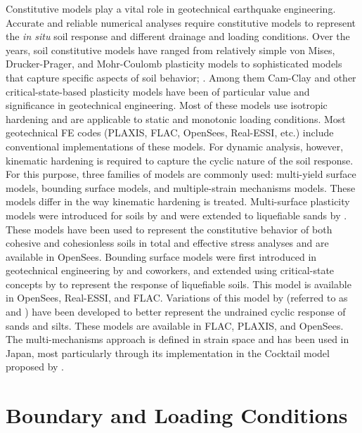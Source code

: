 Constitutive models play a vital role in geotechnical earthquake engineering. Accurate and reliable numerical analyses require constitutive models to represent the \textit{in situ} soil response and different drainage and loading conditions. Over the years, soil constitutive models  have ranged from relatively simple von Mises, Drucker-Prager, and Mohr-Coulomb plasticity models to sophisticated models that capture specific aspects of soil behavior; \cite[see][]{Borja2013}. Among them Cam-Clay and other critical-state-based plasticity models have been of particular value and significance in geotechnical engineering. Most of these models use isotropic hardening and are applicable to static and monotonic loading conditions. Most geotechnical FE codes (PLAXIS, FLAC, OpenSees, Real-ESSI, etc.) include conventional implementations of these models. For dynamic analysis, however, kinematic hardening is required to capture the cyclic nature of the soil response. For this purpose, three families of models are commonly used: multi-yield surface models, bounding surface models, and multiple-strain mechanisms models. These models differ in the way kinematic hardening is treated. Multi-surface plasticity models were introduced for soils by \citet{Prevost77, Prevost85a} and were extended to liquefiable sands by \citet{Elgamal03}. These models have been used to represent the constitutive behavior of both cohesive and cohesionless soils in total and effective stress analyses and are available in OpenSees. Bounding surface models were first introduced in geotechnical engineering by \citet{Dafalias86} and coworkers, and extended using critical-state concepts by \citet{Dafalias04} to represent the response of liquefiable soils. This model is available in OpenSees, Real-ESSI, and FLAC. Variations of this model by \citet{boulanger2017pm4sand, boulanger2018pm4silt} (referred to as  and ) have been developed to better represent the undrained cyclic response of sands and silts. These models are available in FLAC, PLAXIS, and OpenSees. The multi-mechanisms approach is defined in strain space and has been used in Japan, most particularly through its implementation in the Cocktail model proposed by \citet{iai2011dilatancy, iai2013finite}.

\section{Boundary and Loading Conditions}
\label{sec:resp_geotech_5}

